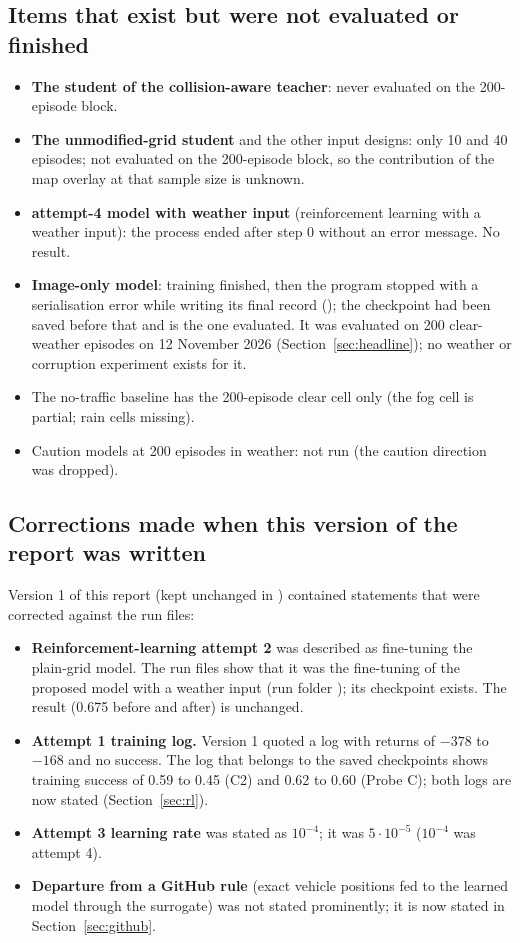 \subsection{Items that exist but were not evaluated or finished}
\begin{itemize}
\item \textbf{The student of the collision-aware teacher}: never evaluated on the 200-episode block.
\item \textbf{The unmodified-grid student} and the other input designs: only 10 and 40 episodes; not evaluated on the 200-episode block, so the contribution of the map overlay at that sample size is unknown.
\item \textbf{attempt-4 model with weather input} (reinforcement learning with a weather input): the process ended after step 0 without an error message. No result.
\item \textbf{Image-only model}: training finished, then the program stopped with a serialisation error while writing its final record (); the checkpoint  had been saved before that and is the one evaluated. It was evaluated on 200 clear-weather episodes on 12 November 2026 (Section~\ref{sec:headline}); no weather or corruption experiment exists for it.
\item The no-traffic baseline has the 200-episode clear cell only (the fog cell is partial; rain cells missing).
\item Caution models at 200 episodes in weather: not run (the caution direction was dropped).
\end{itemize}

\subsection{Corrections made when this version of the report was written}
Version 1 of this report (kept unchanged in ) contained statements that were corrected against the run files:
\begin{itemize}
\item \textbf{Reinforcement-learning attempt 2} was described as fine-tuning the plain-grid model. The run files show that it was the fine-tuning of the proposed model with a weather input (run folder ); its checkpoint exists. The result (0.675 before and after) is unchanged.
\item \textbf{Attempt 1 training log.} Version 1 quoted a log with returns of $-378$ to $-168$ and no success. The log that belongs to the saved checkpoints shows training success of 0.59 to 0.45 (C2) and 0.62 to 0.60 (Probe C); both logs are now stated (Section~\ref{sec:rl}).
\item \textbf{Attempt 3 learning rate} was stated as $10^{-4}$; it was $5\cdot10^{-5}$ ($10^{-4}$ was attempt 4).
\item \textbf{Departure from a GitHub rule} (exact vehicle positions fed to the learned model through the surrogate) was not stated prominently; it is now stated in Section~\ref{sec:github}.
\end{itemize}

